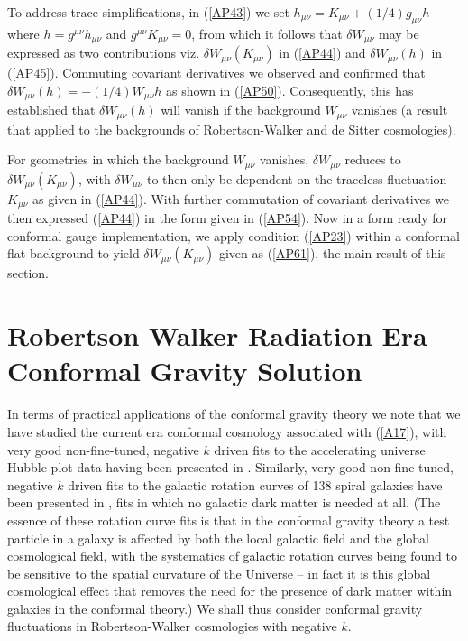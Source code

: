 To address trace simplifications, in (\ref{AP43}) we set  $h_{\mu\nu}=K_{\mu\nu}+(1/4)g_{\mu\nu}h$ where $h=g^{\mu\nu}h_{\mu\nu}$ and $g^{\mu\nu}K_{\mu\nu}=0$, from which it follows that $\delta W_{\mu\nu}$ may be expressed as two contributions viz. $\delta W_{\mu\nu}(K_{\mu\nu})$ in (\ref{AP44}) and $\delta W_{\mu\nu}(h)$ in (\ref{AP45}). Commuting covariant derivatives we observed and confirmed that $\delta W_{\mu\nu}(h)=-(1/4)W_{\mu\nu}h$ as shown in (\ref{AP50}). Consequently, this has established that $\delta W_{\mu\nu}(h)$ will vanish if the background $W_{\mu\nu}$ vanishes (a result that applied to the backgrounds of Robertson-Walker and de Sitter cosmologies).

For geometries in which the background $W_{\mu\nu}$ vanishes, $\delta W_{\mu\nu}$ reduces to $\delta W_{\mu\nu}(K_{\mu\nu})$, with $\delta W_{\mu\nu}$ to then only be dependent on the traceless fluctuation $K_{\mu\nu}$ as given in (\ref{AP44}). With further commutation of covariant derivatives we then expressed (\ref{AP44}) in the form given in (\ref{AP54}). Now in a form ready for conformal gauge implementation, we apply condition (\ref{AP23}) within a conformal flat background to yield $\delta W_{\mu\nu}(K_{\mu\nu})$ given as (\ref{AP61}), the main result of this section.

\section{Robertson Walker Radiation Era Conformal Gravity Solution}
\label{s:rw_radiation_conformal_gravity_sol}

In terms of practical applications of the conformal gravity theory we note that we have studied the current era conformal cosmology associated with (\ref{A17}), with very good non-fine-tuned, negative $k$  driven fits to the accelerating universe Hubble plot data having been presented in \cite{mannheim_2006,mannheim_2017}. Similarly, very good non-fine-tuned, negative $k$ driven fits  to the galactic rotation curves of 138 spiral galaxies have been presented in \cite{mannheim_2011,mannheim_2012, obrien_mannheim_2012}, fits in which no galactic dark matter is needed at all. (The essence of these rotation curve fits is that in the conformal gravity theory a test particle in a galaxy is affected by both the local galactic field and the global cosmological field, with the systematics of galactic rotation curves being found to be sensitive to the spatial curvature of the Universe -- in fact it is this global cosmological effect that removes the need for the presence of dark matter within galaxies in the conformal theory.) We shall thus consider conformal gravity fluctuations in Robertson-Walker cosmologies with negative $k$.


